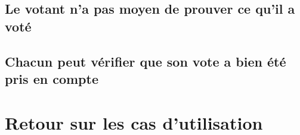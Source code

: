 \documentclass[../report]{subfiles}
\begin{document}
\section{Le votant n'a pas moyen de prouver ce qu'il a voté}
\todo{}
\section{Chacun peut vérifier que son vote a bien été pris en compte}
\todo{}

\chapter{Retour sur les cas d'utilisation}
\todo{}
\end{document}
